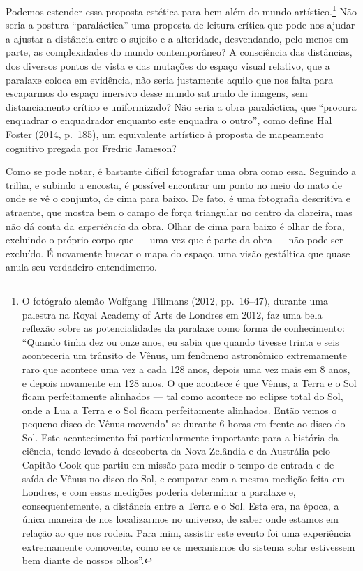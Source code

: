 Podemos estender essa proposta estética para bem além do mundo
artístico.\footnote{O fotógrafo alemão Wolfgang Tillmans (2012, pp.~16--47), durante uma
  palestra na Royal Academy of Arts de Londres em 2012, faz uma bela
  reflexão sobre as potencialidades da paralaxe como forma de
  conhecimento: ``Quando tinha dez ou onze anos, eu sabia que quando
  tivesse trinta e seis aconteceria um trânsito de Vênus, um fenômeno
  astronômico extremamente raro que acontece uma vez a cada 128 anos,
  depois uma vez mais em 8 anos, e depois novamente em 128 anos. O que
  acontece é que Vênus, a Terra e o Sol ficam perfeitamente alinhados ---
  tal como acontece no eclipse total do Sol, onde a Lua a Terra e o Sol
  ficam perfeitamente alinhados. Então vemos o pequeno disco de Vênus
  movendo"-se durante 6 horas em frente ao disco do Sol. Este
  acontecimento foi particularmente importante para a história da
  ciência, tendo levado à descoberta da Nova Zelândia e da Austrália
  pelo Capitão Cook que partiu em missão para medir o tempo de entrada e
  de saída de Vênus no disco do Sol, e comparar com a mesma medição
  feita em Londres, e com essas medições poderia determinar a paralaxe
  e, consequentemente, a distância entre a Terra e o Sol. Esta era, na
  época, a única maneira de nos localizarmos no universo, de saber onde
  estamos em relação ao que nos rodeia. Para mim, assistir este evento
  foi uma experiência extremamente comovente, como se os mecanismos do
  sistema solar estivessem bem diante de nossos olhos''.} Não
seria a postura ``paraláctica'' uma proposta de leitura crítica que pode
nos ajudar a ajustar a distância entre o sujeito e a alteridade,
desvendando, pelo menos em parte, as complexidades do mundo
contemporâneo? A consciência das distâncias, dos diversos pontos de
vista e das mutações do espaço visual relativo, que a paralaxe coloca em
evidência, não seria justamente aquilo que nos falta para escaparmos do
espaço imersivo desse mundo saturado de imagens, sem distanciamento
crítico e uniformizado? Não seria a obra paraláctica, que ``procura
enquadrar o enquadrador enquanto este enquadra o outro'', como define
Hal Foster (2014, p.~185), um equivalente artístico à proposta de
mapeamento cognitivo pregada por Fredric Jameson?

Como se pode notar, é bastante difícil fotografar uma obra como essa.
Seguindo a trilha, e subindo a encosta, é possível encontrar um ponto no
meio do mato de onde se vê o conjunto, de cima para baixo. De fato, é
uma fotografia descritiva e atraente, que mostra bem o campo de força
triangular no centro da clareira, mas não dá conta da \emph{experiência}
da obra. Olhar de cima para baixo é olhar de fora, excluindo o próprio
corpo que --- uma vez que é parte da obra --- não pode ser excluído. É
novamente buscar o mapa do espaço, uma visão gestáltica que quase anula
seu verdadeiro entendimento.

